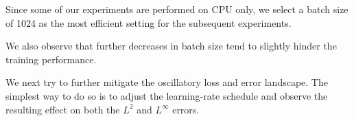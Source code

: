 
Since some of our experiments are performed on CPU only,
we select a batch size of 1024 as the most efficient setting for the subsequent experiments.

We also observe that further decreases in batch size tend to slightly hinder the training performance.

%
%
%
%
%




We next try to further mitigate the oscillatory loss and error landscape.
The simplest way to do so is to adjust the learning-rate schedule and observe the resulting effect on both the $L^2$ and $L^\infty$ errors.

